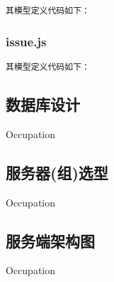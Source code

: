 \noindent
\texttt{\large 其模型定义代码如下：}


\subsubsection{issue.js}

\noindent
\texttt{\large 其模型定义代码如下：}


\subsection{数据库设计}
\indent
Occupation

\subsection{服务器(组)选型}
\indent
Occupation

\subsection{服务端架构图}
\indent
Occupation